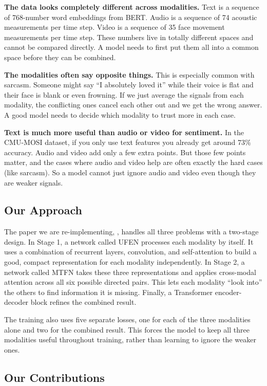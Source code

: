 \documentclass[11pt,twocolumn]{article}
\begin{document}
\textbf{The data looks completely different across modalities.} Text is a sequence of 768-number word embeddings from BERT. Audio is a sequence of 74 acoustic measurements per time step. Video is a sequence of 35 face movement measurements per time step. These numbers live in totally different spaces and cannot be compared directly. A model needs to first put them all into a common space before they can be combined.

\textbf{The modalities often say opposite things.} This is especially common with sarcasm. Someone might say ``I absolutely loved it'' while their voice is flat and their face is blank or even frowning. If we just average the signals from each modality, the conflicting ones cancel each other out and we get the wrong answer. A good model needs to decide which modality to trust more in each case.

\textbf{Text is much more useful than audio or video for sentiment.} In the CMU-MOSI dataset, if you only use text features you already get around 73\% accuracy. Audio and video add only a few extra points. But those few points matter, and the cases where audio and video help are often exactly the hard cases (like sarcasm). So a model cannot just ignore audio and video even though they are weaker signals.

\subsection{Our Approach}

The paper we are re-implementing, \citet{cai2025multimodal}, handles all three problems with a two-stage design. In Stage 1, a network called UFEN processes each modality by itself. It uses a combination of recurrent layers, convolution, and self-attention to build a good, compact representation for each modality independently. In Stage 2, a network called MTFN takes these three representations and applies cross-modal attention across all six possible directed pairs. This lets each modality ``look into'' the others to find information it is missing. Finally, a Transformer encoder-decoder block refines the combined result.

The training also uses five separate losses, one for each of the three modalities alone and two for the combined result. This forces the model to keep all three modalities useful throughout training, rather than learning to ignore the weaker ones.

\subsection{Our Contributions}
\end{document}
